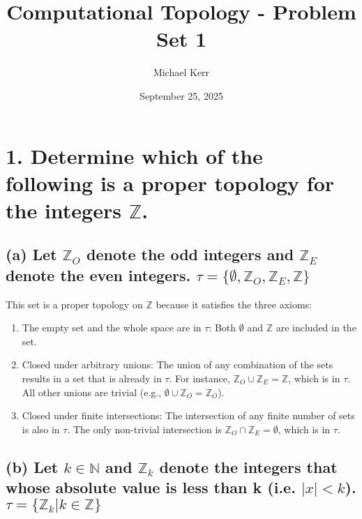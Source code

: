 \documentclass{article}
\title{Computational Topology - Problem Set 1}
\author{Michael Kerr}
\date{September 25, 2025}
\begin{document}
\maketitle

\section*{1. Determine which of the following is a proper topology for the integers $\mathbb{Z}$.}

\subsection*{(a) Let $\mathbb{Z}_{O}$ denote the odd integers and $\mathbb{Z}_{E}$ denote the even integers. $\tau=\{\emptyset,\mathbb{Z}_{O},\mathbb{Z}_{E},\mathbb{Z}\}$}

This set is a proper topology on $\mathbb{Z}$ because it satisfies the three axioms:

\begin{enumerate}
    \item The empty set and the whole space are in $\tau$: Both $\emptyset$ and $\mathbb{Z}$ are included in the set.

    \item Closed under arbitrary unions: The union of any combination of the sets results in a set that is already in $\tau$. For instance, $\mathbb{Z}_{O} \cup \mathbb{Z}_{E} = \mathbb{Z}$, which is in $\tau$. All other unions are trivial (e.g., $\emptyset \cup \mathbb{Z}_O = \mathbb{Z}_O$).

    \item Closed under finite intersections: The intersection of any finite number of sets is also in $\tau$. The only non-trivial intersection is $\mathbb{Z}_{O} \cap \mathbb{Z}_{E} = \emptyset$, which is in $\tau$.
\end{enumerate}

\hrulefill

\subsection*{(b) Let $k\in\mathbb{N}$ and $\mathbb{Z}_{k}$ denote the integers that whose absolute value is less than k (i.e. $|x|<k$). $\tau=\{\mathbb{Z}_{k}|k\in\mathbb{Z}\}$}
\end{document}
